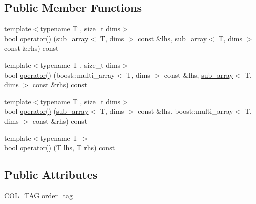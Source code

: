 \subsection*{Public Member Functions}
\begin{DoxyCompactItemize}
\item 
{\footnotesize template$<$typename T , size\+\_\+t dims$>$ }\\bool \mbox{\hyperlink{struct_similarity_matrices_1_1matrix_sort_adc975ab7262660216ad3a081c79e3672}{operator()}} (\mbox{\hyperlink{struct_similarity_matrices_1_1matrix_sort_ae39e66ff77c02f615725350ab7d68f71}{sub\+\_\+array}}$<$ T, dims $>$ const \&lhs, \mbox{\hyperlink{struct_similarity_matrices_1_1matrix_sort_ae39e66ff77c02f615725350ab7d68f71}{sub\+\_\+array}}$<$ T, dims $>$ const \&rhs) const
\item 
{\footnotesize template$<$typename T , size\+\_\+t dims$>$ }\\bool \mbox{\hyperlink{struct_similarity_matrices_1_1matrix_sort_ace2f6acabe2ccd150430fbcfdeb68aad}{operator()}} (boost\+::multi\+\_\+array$<$ T, dims $>$ const \&lhs, \mbox{\hyperlink{struct_similarity_matrices_1_1matrix_sort_ae39e66ff77c02f615725350ab7d68f71}{sub\+\_\+array}}$<$ T, dims $>$ const \&rhs) const
\item 
{\footnotesize template$<$typename T , size\+\_\+t dims$>$ }\\bool \mbox{\hyperlink{struct_similarity_matrices_1_1matrix_sort_ae81fac7e6ef133ae6fa3d6c08969ff76}{operator()}} (\mbox{\hyperlink{struct_similarity_matrices_1_1matrix_sort_ae39e66ff77c02f615725350ab7d68f71}{sub\+\_\+array}}$<$ T, dims $>$ const \&lhs, boost\+::multi\+\_\+array$<$ T, dims $>$ const \&rhs) const
\item 
{\footnotesize template$<$typename T $>$ }\\bool \mbox{\hyperlink{struct_similarity_matrices_1_1matrix_sort_a899504739c7de2f5d65f9f5cfe6cbd71}{operator()}} (T lhs, T rhs) const
\end{DoxyCompactItemize}
\subsection*{Public Attributes}
\begin{DoxyCompactItemize}
\item 
\mbox{\hyperlink{class_similarity_matrices_a8fea56a2e7c8a9f692753c8f706e5706}{C\+O\+L\+\_\+\+T\+AG}} \mbox{\hyperlink{struct_similarity_matrices_1_1matrix_sort_a0f3a523f5e5957fc30a3bea82be1464c}{order\+\_\+tag}}
\end{DoxyCompactItemize}


